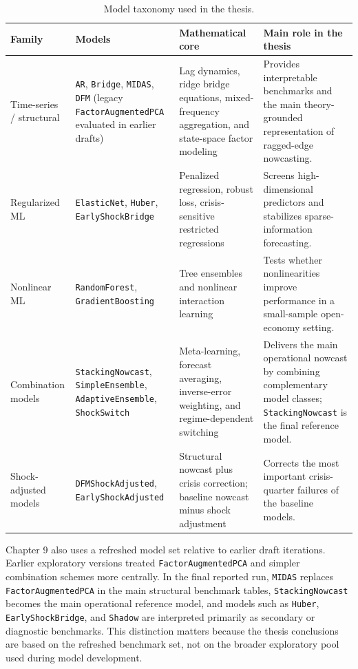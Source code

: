 \documentclass[12pt,a4paper]{report}
\begin{document}
\begin{table}[H]
    \centering
    \small
    \caption{Model taxonomy used in the thesis.}
    \label{tab:model_taxonomy_summary}
    \begin{tabularx}{\textwidth}{>{\raggedright\arraybackslash}p{2.0cm}YYY}
        \toprule
        Family & Models & Mathematical core & Main role in the thesis \\
        \midrule
        Time-series / structural & \texttt{AR}, \texttt{Bridge}, \texttt{MIDAS}, \texttt{DFM} (legacy \texttt{FactorAugmentedPCA} evaluated in earlier drafts) & Lag dynamics, ridge bridge equations, mixed-frequency aggregation, and state-space factor modeling & Provides interpretable benchmarks and the main theory-grounded representation of ragged-edge nowcasting. \\
        Regularized ML & \texttt{ElasticNet}, \texttt{Huber}, \texttt{EarlyShockBridge} & Penalized regression, robust loss, crisis-sensitive restricted regressions & Screens high-dimensional predictors and stabilizes sparse-information forecasting. \\
        Nonlinear ML & \texttt{RandomForest}, \texttt{GradientBoosting} & Tree ensembles and nonlinear interaction learning & Tests whether nonlinearities improve performance in a small-sample open-economy setting. \\
        Combination models & \texttt{StackingNowcast}, \texttt{SimpleEnsemble}, \texttt{AdaptiveEnsemble}, \texttt{ShockSwitch} & Meta-learning, forecast averaging, inverse-error weighting, and regime-dependent switching & Delivers the main operational nowcast by combining complementary model classes; \texttt{StackingNowcast} is the final reference model. \\
        Shock-adjusted models & \texttt{DFMShockAdjusted}, \texttt{EarlyShockAdjusted} & Structural nowcast plus crisis correction; baseline nowcast minus shock adjustment & Corrects the most important crisis-quarter failures of the baseline models. \\
        \bottomrule
    \end{tabularx}
\end{table}

Chapter 9 also uses a refreshed model set relative to earlier draft iterations. Earlier exploratory versions treated \texttt{FactorAugmentedPCA} and simpler combination schemes more centrally. In the final reported run, \texttt{MIDAS} replaces \texttt{FactorAugmentedPCA} in the main structural benchmark tables, \texttt{StackingNowcast} becomes the main operational reference model, and models such as \texttt{Huber}, \texttt{EarlyShockBridge}, and \texttt{Shadow} are interpreted primarily as secondary or diagnostic benchmarks. This distinction matters because the thesis conclusions are based on the refreshed benchmark set, not on the broader exploratory pool used during model development.
\end{document}
